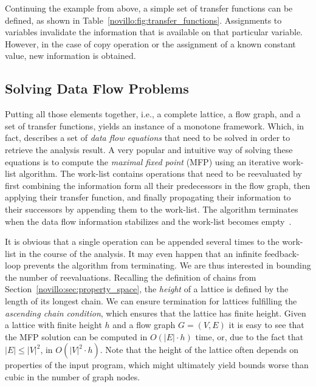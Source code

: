 Continuing the example from above, a simple set of transfer functions can be
defined, as shown in Table~\ref{novillo:fig:transfer_functions}. Assignments to
variables invalidate the information that is available on that particular
variable. However, in the case of copy operation or the assignment of a known
constant value, new information is obtained.

\subsection{Solving Data Flow Problems}

Putting all those elements together, i.e., a complete lattice, a flow graph, and
a set of transfer functions, yields an instance of a monotone framework. Which,
in fact, describes a set of \emph{data flow equations} that need to be solved in
order to retrieve the analysis result. A very popular and intuitive way of
solving these equations is to compute the \emph{maximal fixed point} (MFP) using
an iterative work-list algorithm. The work-list contains operations that need
to be reevaluated by first combining the information form all their predecessors
in the flow graph, then applying their transfer function, and finally
propagating their information to their successors by appending them to the
work-list. The algorithm terminates when the data flow information stabilizes
and the work-list becomes empty~\cite{novillo:bib:NNH99}.

It is obvious that a single operation can be appended several times to the
work-list in the course of the analysis. It may even happen that an infinite
feedback-loop prevents the algorithm from terminating. We are thus interested in
bounding the number of reevaluations. Recalling the definition of chains from
Section~\ref{novillo:sec:property_space}, the \emph{height} of a lattice is
defined by the length of its longest chain. We can ensure termination for
lattices fulfilling the \emph{ascending chain condition}, which ensures that the
lattice has finite height. Given a lattice with finite height $h$ and a flow
graph $G=(V, E)$ it is easy to see that the MFP solution can be computed in
$O(|E| \cdot h)$ time, or, due to the fact that $|E| \leq |V|^2$, in $O(|V|^2
\cdot h)$. Note that the height of the lattice often depends on properties of
the input program, which might ultimately yield bounds worse than cubic in the
number of graph nodes.

